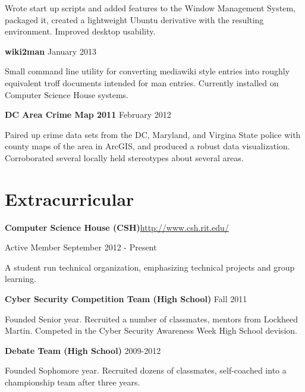 \documentclass[letter,margin,line]{resume}
\newcommand{\rurl}[1]{\hfill {\footnotesize \url{#1}}}
\begin{document}
\begin{resume}
\begin{asparablank}
		\small Wrote start up scripts and added features to the Window Management System, packaged it, created a lightweight Ubuntu derivative with the resulting environment. Improved desktop usability.  
		\normalsize
		\\
		
		\item {\bf wiki2man} \hfill January 2013
		
		\small Small command line utility for converting mediawiki style entries into roughly equivalent troff documents intended for man entries. Currently installed on Computer Science House systems.
		\normalsize
		\\
		
		\item {\bf DC Area Crime Map 2011} \hfill February 2012
		
		\small Paired up crime data sets from the DC, Maryland, and Virgina State police with county maps of the area in ArcGIS, and produced a robust data visualization. Corroborated several locally held stereotypes about several areas.
		\normalsize
		\\
	\end{asparablank}

\section{\mysidestyle Extracurricular}
	\begin{asparablank}
		\item {\bf Computer Science House ({\small CSH})}\rurl{http://www.csh.rit.edu/}
		\small	\item Active Member \hfill September 2012 - Present
				\item A student run technical organization, emphasizing technical projects and group learning. 
		\\
		\item {\bf Cyber Security Competition Team ({\small High School})} \hfill Fall 2011
		\small \item Founded Senior year. Recruited a number of classmates, mentors from Lockheed Martin. Competed in the Cyber Security Awareness Week High School devision. 
		\\
		\item {\bf Debate Team ({\small High School})} \hfill 2009-2012
		\small \item Founded Sophomore year. Recruited dozens of classmates, self-coached into a championship team after three years.
	\end{asparablank}

\end{resume}
\end{document}
